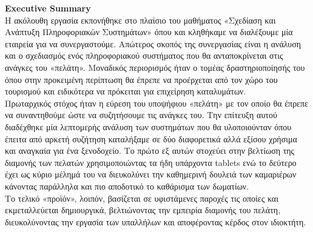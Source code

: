 \noindent
\textbf{Εxecutive Summary}\\

\noindent
Η ακόλουθη εργασία εκπονήθηκε στο πλαίσιο του μαθήματος «Σχεδίαση και 
Ανάπτυξη Πληροφοριακών Συστημάτων» όπου και κληθήκαμε να διαλέξουμε 
μία εταιρεία για να συνεργαστούμε. Απώτερος σκοπός της συνεργασίας είναι η
ανάλυση και ο σχεδιασμός ενός πληροφοριακού συστήματος που θα 
ανταποκρίνεται στις ανάγκες του «πελάτη». Μοναδικός περιορισμός ήταν ο 
τομέας δραστηριοποίησής του όπου στην προκειμένη περίπτωση θα έπρεπε 
να προέρχεται από τον χώρο του τουρισμού και ειδικότερα να πρόκειται για 
επιχείρηση καταλυμάτων.\\

\noindent
Πρωταρχικός στόχος ήταν η εύρεση του υποψήφιου 
«πελάτη» με τον οποίο θα έπρεπε να συναντηθούμε ώστε να συζητήσουμε τις 
ανάγκες του. Την επίτευξη αυτού διαδέχθηκε μία λεπτομερής ανάλυση των 
συστημάτων που θα υλοποιούνταν όπου έπειτα από αρκετή συζήτηση 
καταλήξαμε σε δύο διαφορετικά αλλά εξίσου χρήσιμα και αναγκαία για ένα 
ξενοδοχείο. Το πρώτο εξ αυτών στοχεύει στην βελτίωση της διαμονής των 
πελατών χρησιμοποιώντας τα ήδη υπάρχοντα tablets ενώ το δεύτερο έχει ως 
κύριο μέλημά του να διευκολύνει την καθημερινή δουλειά των καμαριέρων 
κάνοντας παράλληλα και πιο αποδοτικό το καθάρισμα των δωματίων.\\

\noindent
Το τελικό «προϊόν», λοιπόν, βασίζεται σε υφιστάμενες παροχές τις οποίες και 
εκμεταλλεύεται δημιουργικά, βελτιώνοντας την εμπειρία διαμονής του πελάτη, 
διευκολύνοντας την εργασία των υπαλλήλων και αποφέροντας κέρδος στον
ιδιοκτήτη. 